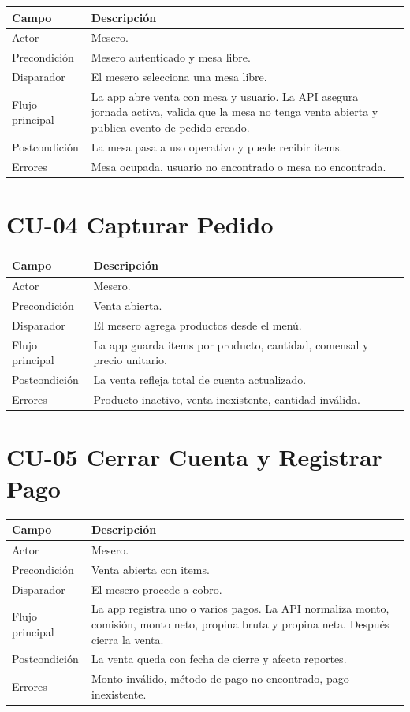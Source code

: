 \documentclass[11pt,letterpaper,openany]{report}
\begin{document}
\begin{longtable}{p{}p{}}
\toprule
\textbf{Campo} & \textbf{Descripción}\\
\midrule
Actor & Mesero.\\
Precondición & Mesero autenticado y mesa libre.\\
Disparador & El mesero selecciona una mesa libre.\\
Flujo principal & La app abre venta con mesa y usuario. La API asegura jornada activa, valida que la mesa no tenga venta abierta y publica evento de pedido creado.\\
Postcondición & La mesa pasa a uso operativo y puede recibir items.\\
Errores & Mesa ocupada, usuario no encontrado o mesa no encontrada.\\
\bottomrule
\end{longtable}

\section{CU-04 Capturar Pedido}

\begin{longtable}{p{}p{}}
\toprule
\textbf{Campo} & \textbf{Descripción}\\
\midrule
Actor & Mesero.\\
Precondición & Venta abierta.\\
Disparador & El mesero agrega productos desde el menú.\\
Flujo principal & La app guarda items por producto, cantidad, comensal y precio unitario.\\
Postcondición & La venta refleja total de cuenta actualizado.\\
Errores & Producto inactivo, venta inexistente, cantidad inválida.\\
\bottomrule
\end{longtable}

\section{CU-05 Cerrar Cuenta y Registrar Pago}

\begin{longtable}{p{}p{}}
\toprule
\textbf{Campo} & \textbf{Descripción}\\
\midrule
Actor & Mesero.\\
Precondición & Venta abierta con items.\\
Disparador & El mesero procede a cobro.\\
Flujo principal & La app registra uno o varios pagos. La API normaliza monto, comisión, monto neto, propina bruta y propina neta. Después cierra la venta.\\
Postcondición & La venta queda con fecha de cierre y afecta reportes.\\
Errores & Monto inválido, método de pago no encontrado, pago inexistente.\\
\bottomrule
\end{longtable}
\end{document}
